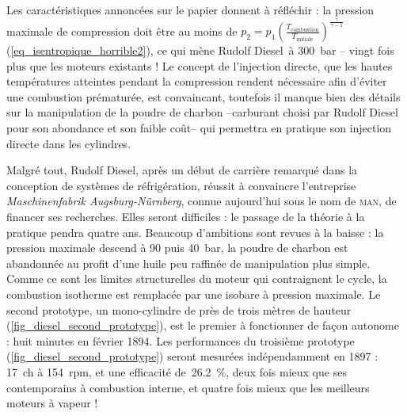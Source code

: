 	Les caractéristiques annoncées sur le papier donnent à réfléchir : la pression maximale de compression doit être au moins de $p_2 = p_1 \left( \frac{T_\text{combustion}}{T_\text{initiale}} \right)^{\frac{\gamma}{\gamma -1}}$ (\ref{eq_isentropique_horrible2}), ce qui mène Rudolf Diesel~à \SI{300}{\bar} -- vingt fois plus que les moteurs existants ! Le concept de l’injection directe, que les hautes températures atteintes pendant la compression rendent nécessaire afin d’éviter une combustion prématurée, est convaincant, toutefois il manque bien des détails sur la manipulation de la poudre de charbon --carburant choisi par Rudolf Diesel pour son abondance et son faible coût-- qui permettra en pratique son injection directe dans les cylindres.

	Malgré tout, Rudolf Diesel, après un début de carrière remarqué dans la conception de systèmes de réfrigération, réussit à convaincre l’entreprise \textit{Maschinenfabrik Augsburg-Nürnberg}, connue aujourd’hui sous le nom de \textsc{man}, de financer ses recherches. Elles seront difficiles : le passage de la théorie à la pratique pendra quatre ans. Beaucoup d’ambitions sont revues à la baisse : la pression maximale descend à \num{90} puis \SI{40}{\bar}, la poudre de charbon est abandonnée au profit d’une huile peu raffinée de manipulation plus simple. Comme ce sont les limites structurelles du moteur qui contraignent le cycle, la combustion isotherme est remplacée par une isobare à pression maximale. Le second prototype, un mono-cylindre de près de trois mètres de hauteur (\cref{fig_diesel_second_prototype}), est le premier à fonctionner de façon autonome : huit minutes en février 1894. Les performances du troisième prototype (\cref{fig_diesel_second_prototype})	seront mesurées indépendamment en 1897 : \SI{17}{ch} à \SI{154}{rpm}, et une efficacité de~\SI{26,2}{\percent}, deux fois mieux que ses contemporains à combustion interne, et quatre fois mieux que les meilleurs moteurs à vapeur !
